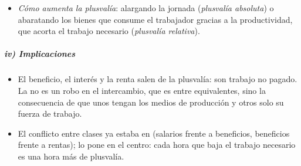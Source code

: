 \documentclass[11pt]{article}
\begin{document}
\begin{itemize}
  \begin{itemize}
  \item \emph{En el ejemplo}: con 5~horas de trabajo necesario y 5~de plustrabajo, $\mathit{pl}'=5/5=100~\%$. Si además $c=80$ y $v=20$, $\mathit{pl}=20$, $c/v=4$ y $g'=20/100=20~\%$.
  \item La tasa de ganancia sube con la explotación y baja con la composición orgánica. Es la tasa de beneficio de  \eqref{eq:beneficio-ricardo} cuando todo el capital es variable ($c=0$).
  \end{itemize}
\item \emph{Cómo aumenta la plusvalía}: alargando la jornada (\emph{plusvalía absoluta}) o abaratando los bienes que consume el trabajador gracias a la productividad, que acorta el trabajo necesario (\emph{plusvalía relativa}).
\end{itemize}
\begin{infografia}[H]
\centering
\caption{La jornada laboral: trabajo necesario y plustrabajo}\label{figu:jornada}
\end{infografia}

\subparagraph{iv) Implicaciones}
\begin{itemize}
\item El beneficio, el interés y la renta salen de la plusvalía: son trabajo no pagado. La  no es un robo en el intercambio, que es entre equivalentes, sino la consecuencia de que unos tengan los medios de producción y otros solo su fuerza de trabajo.
\item El conflicto entre clases ya estaba en  (salarios frente a beneficios, beneficios frente a rentas);  lo pone en el centro: cada hora que baja el trabajo necesario es una hora más de plusvalía.
\end{itemize}
\end{document}
